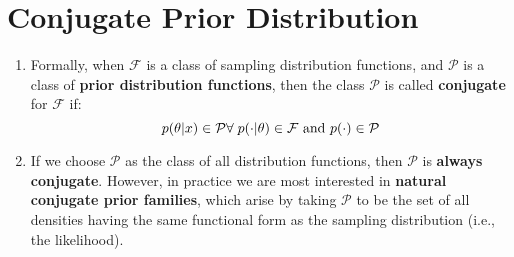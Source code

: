 \section{Conjugate Prior Distribution \cite{ism-1}} \label{conjugate prior distribution}

\begin{enumerate}
    \item Formally, when $\mathcal{F}$ is a class of sampling distribution functions, and $\mathcal{P}$ is a class of \textbf{prior distribution functions}, then the class $\mathcal{P}$ is called \textbf{conjugate} for $\mathcal{F}$ if:
    \[
        \hfill
        p(\theta|x) \in \mathcal{P} 
        \hfill
        \forall\; 
        p(\cdot|\theta) \in \mathcal{F} 
        \text{ and } 
        p(\cdot) \in \mathcal{P}
    \]

    \item If we choose $\mathcal{P}$ as the class of all distribution functions, then $\mathcal{P}$ is \textbf{always conjugate}. However, in practice we are most interested in \textbf{natural conjugate prior families}, which arise by taking $\mathcal{P}$ to be the set of all densities having the same functional form as the sampling distribution (i.e., the likelihood).
\end{enumerate}
































